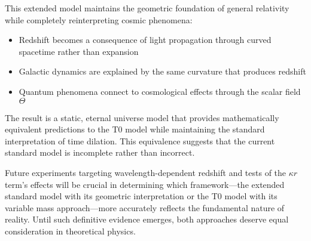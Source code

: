 \documentclass[12pt,a4paper]{article}
\begin{document}
	This extended model maintains the geometric foundation of general relativity while completely reinterpreting cosmic phenomena:
	\begin{itemize}
		\item Redshift becomes a consequence of light propagation through curved spacetime rather than expansion
		\item Galactic dynamics are explained by the same curvature that produces redshift
		\item Quantum phenomena connect to cosmological effects through the scalar field $\Theta$
	\end{itemize}
	
	The result is a static, eternal universe model that provides mathematically equivalent predictions to the T0 model while maintaining the standard interpretation of time dilation. This equivalence suggests that the current standard model is incomplete rather than incorrect.
	
	Future experiments targeting wavelength-dependent redshift and tests of the $\kappa r$ term's effects will be crucial in determining which framework—the extended standard model with its geometric interpretation or the T0 model with its variable mass approach—more accurately reflects the fundamental nature of reality. Until such definitive evidence emerges, both approaches deserve equal consideration in theoretical physics.
	
\end{document}
